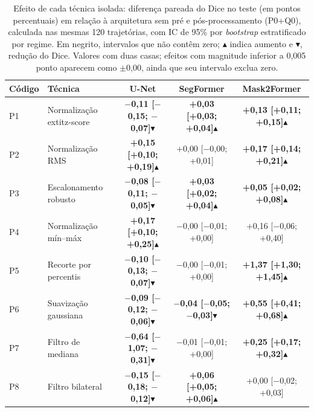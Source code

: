 \begin{table}[htbp]
\centering
\caption{Efeito de cada técnica isolada: diferença pareada do Dice no teste (em pontos percentuais) em relação à arquitetura sem pré e pós-processamento (P0+Q0), calculada nas mesmas 120 trajetórias, com IC de 95\% por \textit{bootstrap} estratificado por regime. Em negrito, intervalos que não contêm zero; $\blacktriangle$ indica aumento e $\blacktriangledown$, redução do Dice. Valores com duas casas; efeitos com magnitude inferior a 0,005 ponto aparecem como $\pm$0,00, ainda que seu intervalo exclua zero.}
\label{tab:efeitos}
\footnotesize\setlength{\tabcolsep}{3pt}
\begin{sbcfitwidth}
\begin{tabular}{llccc}
\toprule
Código & Técnica & U-Net & SegFormer & Mask2Former \\
\midrule
P1 & Normalização 	extit{z-score} & \textbf{$-$0{,}11 [$-$0{,}15; $-$0{,}07]}$\blacktriangledown$ & \textbf{+0{,}03 [+0{,}03; +0{,}04]}$\blacktriangle$ & \textbf{+0{,}13 [+0{,}11; +0{,}15]}$\blacktriangle$ \\
P2 & Normalização RMS & \textbf{+0{,}15 [+0{,}10; +0{,}19]}$\blacktriangle$ & +0{,}00 [$-$0{,}00; +0{,}01] & \textbf{+0{,}17 [+0{,}14; +0{,}21]}$\blacktriangle$ \\
P3 & Escalonamento robusto & \textbf{$-$0{,}08 [$-$0{,}11; $-$0{,}05]}$\blacktriangledown$ & \textbf{+0{,}03 [+0{,}02; +0{,}04]}$\blacktriangle$ & \textbf{+0{,}05 [+0{,}02; +0{,}08]}$\blacktriangle$ \\
P4 & Normalização mín--máx & \textbf{+0{,}17 [+0{,}10; +0{,}25]}$\blacktriangle$ & $-$0{,}00 [$-$0{,}01; +0{,}00] & +0{,}16 [$-$0{,}06; +0{,}40] \\
P5 & Recorte por percentis & \textbf{$-$0{,}10 [$-$0{,}13; $-$0{,}07]}$\blacktriangledown$ & $-$0{,}00 [$-$0{,}01; +0{,}00] & \textbf{+1{,}37 [+1{,}30; +1{,}45]}$\blacktriangle$ \\
P6 & Suavização gaussiana & \textbf{$-$0{,}09 [$-$0{,}12; $-$0{,}06]}$\blacktriangledown$ & \textbf{$-$0{,}04 [$-$0{,}05; $-$0{,}03]}$\blacktriangledown$ & \textbf{+0{,}55 [+0{,}41; +0{,}68]}$\blacktriangle$ \\
P7 & Filtro de mediana & \textbf{$-$0{,}64 [$-$1{,}07; $-$0{,}31]}$\blacktriangledown$ & $-$0{,}01 [$-$0{,}01; +0{,}00] & \textbf{+0{,}25 [+0{,}17; +0{,}32]}$\blacktriangle$ \\
P8 & Filtro bilateral & \textbf{$-$0{,}15 [$-$0{,}18; $-$0{,}12]}$\blacktriangledown$ & \textbf{+0{,}06 [+0{,}05; +0{,}06]}$\blacktriangle$ & +0{,}00 [$-$0{,}02; +0{,}03] \\

\end{tabular}
\end{sbcfitwidth}
\end{table}
